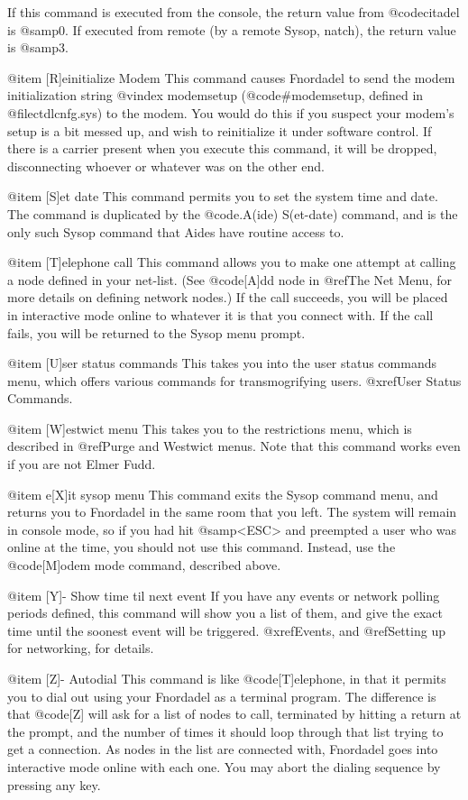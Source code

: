If this command is executed from the console, the return value
from @code{citadel} is @samp{0}.  If executed from remote (by a remote Sysop,
natch), the return value is @samp{3}.

@item [R]einitialize Modem
This command causes Fnordadel to send the modem
initialization string
@vindex modemsetup
(@code{#modemsetup}, defined in @file{ctdlcnfg.sys})
to the modem.  You
would do this if you suspect your modem's setup is a bit messed up,
and wish to reinitialize it under software control.  If there is a
carrier present when you execute this command, it will be dropped,
disconnecting whoever or whatever was on the other end.

@item [S]et date
This command permits you to set the system time and date.
The command is duplicated by the @code{.A(ide) S(et-date)} command, and is
the only such Sysop command that Aides have routine access to.

@item [T]elephone call
This command allows you to make one attempt at calling a node defined in your
net-list.  (See @code{[A]dd node} in @ref{The Net Menu}, for more details on
defining network nodes.)  If the call succeeds, you will be placed
in interactive mode online to whatever it is that you connect with.
If the call fails, you will be returned to the Sysop menu prompt.

@item [U]ser status commands
This takes you into the user status commands menu,
which offers various commands for transmogrifying users.  @xref{User Status Commands}.

@item [W]estwict menu
This takes you to the restrictions menu, which is described in
@ref{Purge and Westwict menus}.  Note that this command works even if you
are not Elmer Fudd.

@item e[X]it sysop menu
This command exits the Sysop command menu, and returns you to
Fnordadel in the same room that you left.  The system will remain in
console mode, so if you had hit @samp{<ESC>} and preempted a user who was
online at the time, you should not use this command.  Instead, use
the @code{[M]odem mode} command, described above.

@item [Y]- Show time til next event
If you have any events or network polling periods defined, this
command will show you a list of them, and give the exact time until the
soonest event will be triggered.
@xref{Events}, and @ref{Setting up for networking}, for details.

@item [Z]- Autodial
This command is like @code{[T]elephone}, in that it permits you to
dial out using your Fnordadel as a terminal program.  The difference
is that @code{[Z]} will ask for a list of nodes to call, terminated by
hitting a return at the prompt, and the number of times it
should loop through that list trying to get a connection.  As nodes
in the list are connected with, Fnordadel goes into interactive
mode online with each one.  You may abort the dialing sequence by
pressing any key.

